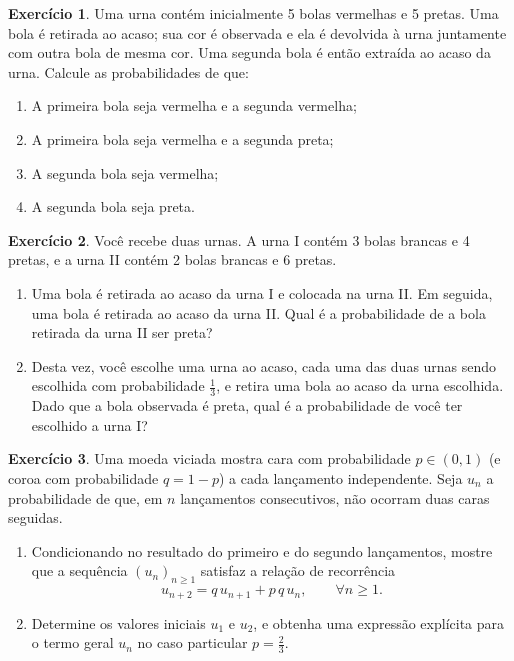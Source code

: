 \documentclass[12pt,portuguese]{article}
\let\ge\geqslant
\theoremstyle{definition}
\newtheorem{exercise}{Exercício}
\begin{document}
\begin{exercise}\label{exercise:urna-reposicao}
Uma urna contém inicialmente 5 bolas vermelhas e 5 pretas. Uma bola é retirada ao acaso; sua cor é observada e ela é devolvida à urna juntamente com outra bola de mesma cor. Uma segunda bola é então extraída ao acaso da urna. Calcule as probabilidades de que:
\begin{enumerate}[label=(\alph*)]
  \item A primeira bola seja vermelha e a segunda vermelha;
  \item A primeira bola seja vermelha e a segunda preta;
  \item A segunda bola seja vermelha;
  \item A segunda bola seja preta.
\end{enumerate}
\end{exercise}

\begin{exercise}\label{exercise:urnas}
Você recebe duas urnas. A urna I contém 3 bolas brancas e 4 pretas, e a urna II contém 2 bolas brancas e 6 pretas.
\begin{enumerate}[label=(\alph*)]
  \item Uma bola é retirada ao acaso da urna I e colocada na urna II. Em seguida, uma bola é retirada ao acaso da urna II. Qual é a probabilidade de a bola retirada da urna II ser preta?
  \item Desta vez, você escolhe uma urna ao acaso, cada uma das duas urnas sendo escolhida com probabilidade \(\tfrac{1}{3}\), e retira uma
        bola ao acaso da urna escolhida. Dado que a bola observada é preta, qual é a probabilidade de você ter escolhido a urna I?
\end{enumerate}
\end{exercise}

\begin{exercise}\label{exercise:moeda-viciada}
Uma moeda viciada mostra cara com probabilidade \(p \in (0,1)\) (e coroa com probabilidade \(q = 1 - p\)) a cada lançamento independente. Seja \(u_n\) a probabilidade de que, em \(n\) lançamentos consecutivos, não ocorram duas caras seguidas.
\begin{enumerate}[label=(\alph*)]
  \item Condicionando no resultado do primeiro e do segundo lançamentos, mostre que a sequência \((u_n)_{n \ge 1}\) satisfaz a relação de recorrência
  \[
    u_{n+2} = q\,u_{n+1} + p\,q\,u_n, \qquad \forall n \ge 1.
  \]
  \item Determine os valores iniciais \(u_1\) e \(u_2\), e obtenha uma expressão explícita para o termo geral \(u_n\) no caso particular \(p = \tfrac{2}{3}\).
\end{enumerate}
\end{exercise}



\end{document}
